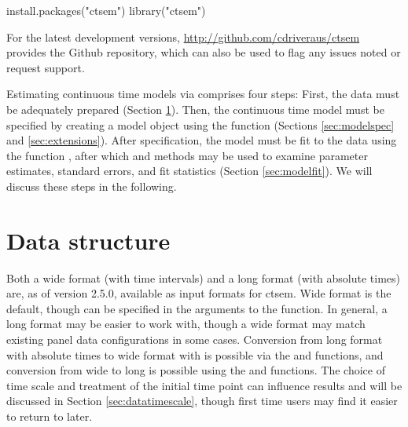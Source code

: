 \documentclass[nojss]{jss}\usepackage[]{graphicx}\usepackage[]{color}
\begin{document}
\begin{Schunk}
\begin{Sinput}
install.packages("ctsem")
library("ctsem")
\end{Sinput}
\end{Schunk}

For the latest development versions, \url{http://github.com/cdriveraus/ctsem} provides the Github repository, which can also be used to flag any issues noted or request support.

Estimating continuous time models via  comprises four steps: First, the data must be adequately prepared (Section \ref{sec:datastructure}). Then, the continuous time model must be specified by creating a  model object using the function  (Sections \ref{sec:modelspec} and \ref{sec:extensions}). After specification, the model must be fit to the data using the function , after which  and  methods may be used to examine parameter estimates, standard errors, and fit statistics (Section \ref{sec:modelfit}). We will discuss these steps in the following.  

\section{Data structure} \label{sec:datastructure}\nopagebreak
Both a wide format (with time intervals) and a long format (with absolute times) are, as of version 2.5.0, available as input formats for ctsem. Wide format is the default, though  can be specified in the arguments to the  function. In general, a long format may be easier to work with, though a wide format may match existing panel data configurations in some cases. Conversion from long format with absolute times to wide format with is possible via the  and  functions, and conversion from wide to long is possible using the  and  functions. The choice of time scale and treatment of the initial time point can influence results and will be discussed in Section \ref{sec:datatimescale}, though first time users may find it easier to return to later.
\end{document}

